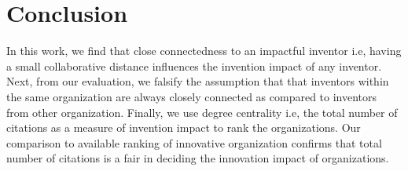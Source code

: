 \section{Conclusion}
In this work, we find that close connectedness to an impactful
inventor i.e, having a small collaborative distance influences the
invention impact of any inventor. Next, from our evaluation, we falsify the assumption that 
that inventors within the same organization are always closely connected as compared to
inventors from other organization. Finally, we use degree centrality i.e, the total number of citations 
as a measure of invention impact to rank the organizations. Our comparison to
available ranking of innovative organization confirms that 
total number of citations is a fair in deciding the innovation impact of organizations.

